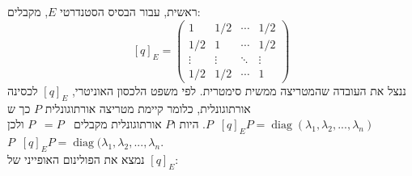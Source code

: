 \documentclass{article}
\DeclareMathOperator{\tra}{^t}
\DeclareMathOperator{\inv}{^{-1}}
\DeclareMathOperator{\diag}{diag}
\begin{document}
ראשית, עבור הבסיס הסטנדרטי $E$, מקבלים:
\[
    [q]_E = \begin{pmatrix}
        1      & 1/2    & \cdots & 1/2    \\
        1/2    & 1      & \cdots & 1/2    \\
        \vdots & \vdots & \ddots & \vdots \\
        1/2    & 1/2    & \cdots & 1
    \end{pmatrix}
\]
ננצל את העובדה שהמטריצה ממשית סימטרית. לפי משפט הלכסון האוניטרי, $[q]_E$ לכסינה אורתוגונלית, כלומר קיימת מטריצה אורתוגונלית $P$ כך ש $P\inv[q]_EP=\diag(\lambda_1, \lambda_2, ..., \lambda_n)$.
היות ו$P$ אורתוגונלית מקבלים $P\inv=P\tra$ ולכן $P\tra [q]_E P=\diag(\lambda_1, \lambda_2, ..., \lambda_n$. \\
נמצא את הפולינום האופייני של $[q]_E:$
\end{document}
